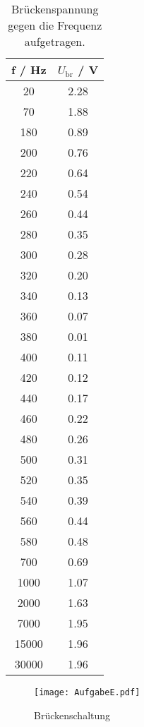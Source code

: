 \begin{table}[H]
  \centering
  \begin{tabular}{c c}
    \toprule
    f / Hz & $U_\text{br}$ / V \\
    \midrule
      20	  &  2.28  \\
      70	  &  1.88  \\
      180	  &  0.89  \\
      200	  &  0.76  \\
      220	  &  0.64  \\
      240	  &  0.54  \\
      260	  &  0.44  \\
      280	  &  0.35  \\
      300	  &  0.28  \\
      320	  &  0.20  \\
      340	  &  0.13  \\
      360	  &  0.07  \\
      380	  &  0.01  \\
      400	  &  0.11  \\
      420	  &  0.12  \\
      440	  &  0.17  \\
      460	  &  0.22  \\
      480	  &  0.26  \\
      500	  &  0.31  \\
      520	  &  0.35  \\
      540	  &  0.39  \\
      560	  &  0.44  \\
      580	  &  0.48  \\
      700	  &  0.69  \\
      1000	&  1.07  \\
      2000	&  1.63  \\
      7000	&  1.95  \\
      15000	&  1.96  \\
      30000	&  1.96  \\
  \end{tabular}
  \caption{Brückenspannung gegen die Frequenz aufgetragen.}
  \label{tab:Brückenspannung}
\end{table}

\begin{figure}[H]
  \centering
  \texttt{[image: AufgabeE.pdf]}
  \caption{Brückenschaltung}
  \label{fig:AufgabeE}
\end{figure}
